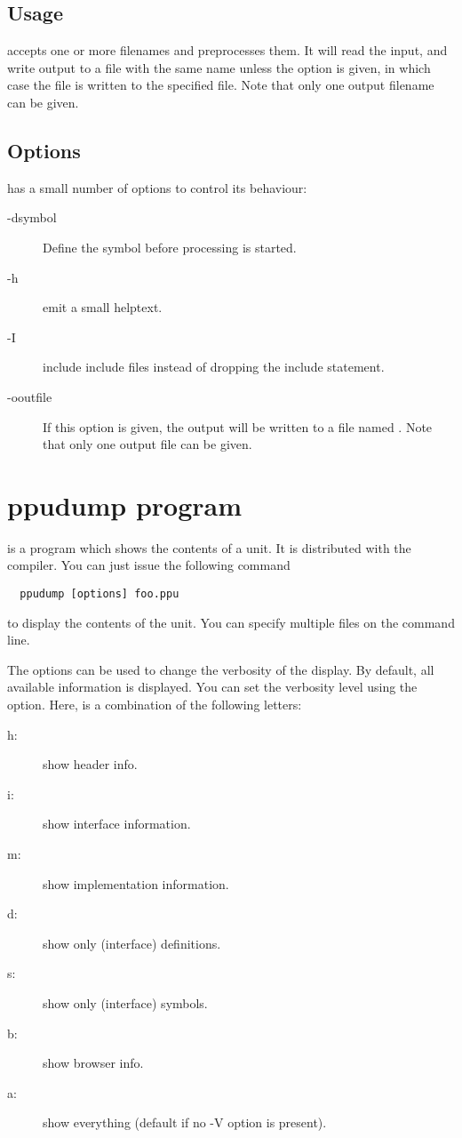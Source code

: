 \subsection{Usage}
 accepts one or more filenames and preprocesses them. 
It will read the input, and write output to a file with the same name 
unless the  option is given, in which case the file is written 
to the specified file. Note that only one output filename can be given.


\subsection{Options}
 has a small number of options to control its behaviour:
\begin{description}
\item[-dsymbol] Define the symbol  before processing is started.
\item[-h] emit a small helptext.
\item[-I] include include files instead of dropping the include statement.
\item[-ooutfile] If this option is given, the output will be written to a 
file named . Note that only one output file can be given.
\end{description}

\section{ppudump program}

 is a program which shows the contents of a \fpc unit. It
is distributed with the compiler. You can just issue the following command
\begin{verbatim}
  ppudump [options] foo.ppu
\end{verbatim}
to display the contents of the  unit. You can specify multiple
files on the command line.

The options can be used to change the verbosity of the display. By default,
all available information is displayed.
You can set the verbosity level using the  option.
Here,  is a combination of the following
letters:
\begin{description}
\item [h:\ ] show header info.
\item [i:\ ] show interface information.
\item [m:\ ] show implementation information.
\item [d:\ ] show only (interface) definitions.
\item [s:\ ] show only (interface) symbols.
\item [b:\ ] show browser info.
\item [a:\ ] show everything (default if no -V option is present).
\end{description}


